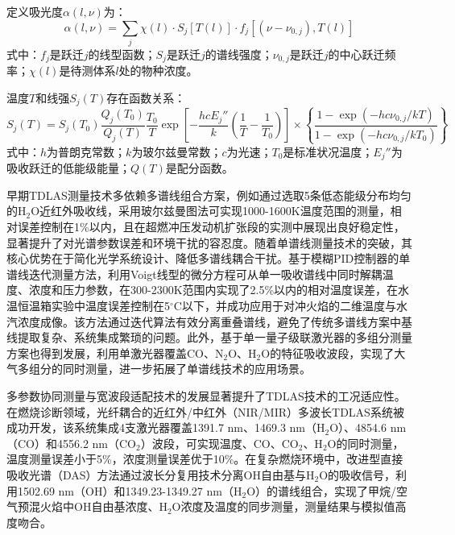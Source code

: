 定义吸光度$\alpha(l,\nu)$为：
\begin{equation}
	\alpha(l,\nu) = \sum_j \chi(l) \cdot S_j[T(l)] \cdot f_j[(\nu - \nu_{0,j}), T(l)]
	\label{eq:absorbance}
\end{equation}
式中：$f_j$是跃迁$j$的线型函数；$S_j$是跃迁$j$的谱线强度；$\nu_{0,j}$是跃迁$j$的中心跃迁频率；$\chi(l)$是待测体系$l$处的物种浓度。

温度$T$和线强$S_j(T)$存在函数关系：
\begin{equation}
	S_j(T) = S_j(T_0) \frac{Q_j(T_0)}{Q_j(T)} \frac{T_0}{T} \exp\left[-\frac{hc E_j''}{k}\left(\frac{1}{T} - \frac{1}{T_0}\right)\right] \times \left\{\frac{1-\exp(-hc\nu_{0,j}/kT)}{1-\exp(-hc\nu_{0,j}/kT_0)}\right\}
	\label{eq:line_strength}
\end{equation}
式中：$h$为普朗克常数；$k$为玻尔兹曼常数；$c$为光速；$T_0$是标准状况温度；$E_j''$为吸收跃迁的低能级能量；$Q(T)$是配分函数。

早期TDLAS测量技术多依赖多谱线组合方案，例如通过选取5条低态能级分布均匀的H$_2$O近红外吸收线，采用玻尔兹曼图法可实现1000-1600K温度范围的测量，相对误差控制在1\%以内，且在超燃冲压发动机扩张段的实测中展现出良好稳定性，显著提升了对光谱参数误差和环境干扰的容忍度。随着单谱线测量技术的突破，其核心优势在于简化光学系统设计、降低多谱线耦合干扰。基于模糊PID控制器的单谱线迭代测量方法，利用Voigt线型的微分方程可从单一吸收谱线中同时解耦温度、浓度和压力参数，在300-2300K范围内实现了2.5\%以内的相对温度误差，在水温恒温箱实验中温度误差控制在5$^\circ$C以下，并成功应用于对冲火焰的二维温度与水汽浓度成像\cite{hsu2021khz, liu2022tunable}。该方法通过迭代算法有效分离重叠谱线，避免了传统多谱线方案中基线提取复杂、系统集成繁琐的问题。此外，基于单一量子级联激光器的多组分测量方案也得到发展，利用单激光器覆盖CO、N$_2$O、H$_2$O的特征吸收波段，实现了大气多组分的同时测量，进一步拓展了单谱线技术的应用场景。

多参数协同测量与宽波段适配技术的发展显著提升了TDLAS技术的工况适应性。在燃烧诊断领域，光纤耦合的近红外/中红外（NIR/MIR）多波长TDLAS系统被成功开发，该系统集成4支激光器覆盖1391.7 nm、1469.3 nm（H$_2$O）、4854.6 nm（CO）和4556.2 nm（CO$_2$）波段，可实现温度、CO、CO$_2$、H$_2$O的同时测量，温度测量误差小于5\%，浓度测量误差优于10\%\cite{shi2022compact}。在复杂燃烧环境中，改进型直接吸收光谱（DAS）方法通过波长分复用技术分离OH自由基与H$_2$O的吸收信号，利用1502.69 nm（OH）和1349.23-1349.27 nm（H$_2$O）的谱线组合，实现了甲烷/空气预混火焰中OH自由基浓度、H$_2$O浓度及温度的同步测量，测量结果与模拟值高度吻合\cite{wen2022concentration}。

